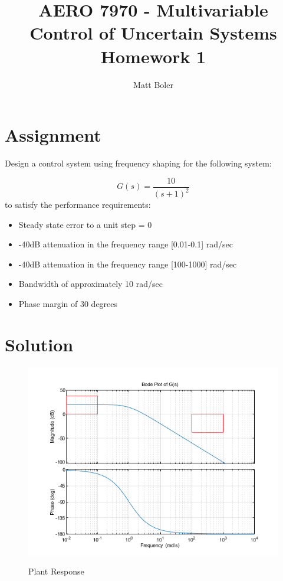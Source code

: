 \documentclass[]{article}
\title{AERO 7970 - Multivariable Control of Uncertain Systems \\ Homework 1}
\author{Matt Boler}
\begin{document}
\maketitle

\section{Assignment}
Design a control system using frequency shaping for the following system:

\begin{equation}
	G(s) = \frac{10}{(s+1)^2}
	\label{eq:G}
\end{equation}
\noindent to satisfy the performance requirements:
\begin{itemize}
	\item Steady state error to a unit step = 0
	\item -40dB attenuation in the frequency range [0.01-0.1] rad/sec
	\item -40dB attenuation in the frequency range [100-1000] rad/sec
	\item Bandwidth of approximately 10 rad/sec
	\item Phase margin of 30 degrees
\end{itemize}

\section{Solution}

\begin{figure}[h]
	\caption{Plant Response}
	\centering
	\includegraphics{Plant}
	\label{fig:plant}
\end{figure}
\end{document}
